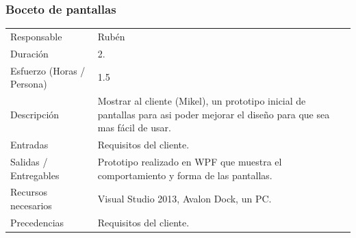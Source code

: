 \subsubsection{Boceto de pantallas}
\begin{table}[H]
    \begin{center}
        \begin{tabular}{l p{8cm}}
            Responsable                           & Rub\'{e}n \\
            Duraci\'{o}n                          & 2. \\ 
            Esfuerzo (Horas / Persona)            & 1.5 \\
            Descripci\'{o}n                       & Mostrar al cliente (Mikel), un prototipo inicial de pantallas
                                                    para asi poder mejorar el dise\~{n}o para que sea mas f\'{a}cil de usar. \\
            Entradas                              & Requisitos del cliente. \\
            Salidas / Entregables                 & Prototipo realizado en WPF que muestra el comportamiento y forma de las pantallas. \\
            Recursos necesarios                   & Visual Studio 2013, Avalon Dock, un PC. \\
            Precedencias                          & Requisitos del cliente. \\
        \end{tabular}
    \end{center}
    
\end{table}

